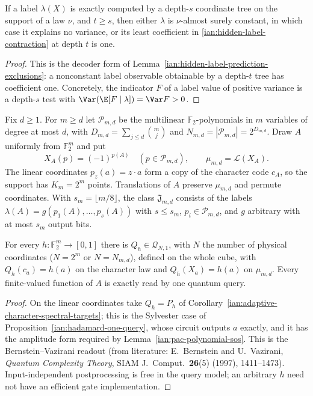 \begin{lemma}
\label{ian:inverse-hp-readable-obstruction}
If a label \(\lambda(X)\) is exactly computed by a depth-\(s\) coordinate tree on the support of a law \(\nu\), and \(t\ge s\), then either \(\lambda\) is \(\nu\)-almost surely constant, in which case it explains no variance, or its least coefficient in \eqref{ian:hidden-label-contraction} at depth \(t\) is one.
\end{lemma}

\begin{proof}
This is the decoder form of Lemma~\ref{ian:hidden-label-prediction-exclusions}: a nonconstant label observable obtainable by a depth-\(t\) tree has coefficient one. Concretely, the indicator \(F\) of a label value of positive variance is a depth-\(s\) test with \(\Var(\E[F\mid\lambda])=\Var F>0\).
\end{proof}

\begin{definition}
\label{ian:inverse-hp-polynomial-law}
Fix \(d\ge1\). For \(m\ge d\) let \(\mathcal P_{m,d}\) be the multilinear \(\mathbb F_2\)-polynomials in \(m\) variables of degree at most \(d\), with \(D_{m,d}=\sum_{j\le d}\binom mj\) and \(N_{m,d}=|\mathcal P_{m,d}|=2^{D_{m,d}}\). Draw \(A\) uniformly from \(\mathbb F_2^m\) and put
\[
 X_A(p)=(-1)^{p(A)}\quad(p\in\mathcal P_{m,d}),\qquad
 \mu_{m,d}=\mathcal L(X_A).
 \tag{37.2}
\]
The linear coordinates \(p_z(a)=z\cdot a\) form a copy of the character code \(c_A\), so the support has \(K_m=2^m\) points. Translations of \(A\) preserve \(\mu_{m,d}\) and permute coordinates. With \(s_m=\lfloor m/8\rfloor\), the class \(\mathfrak J_{m,d}\) consists of the labels \(\lambda(A)=g(p_1(A),\ldots,p_s(A))\) with \(s\le s_m\), \(p_i\in\mathcal P_{m,d}\), and \(g\) arbitrary with at most \(s_m\) output bits.
\end{definition}

\begin{lemma}
\label{ian:inverse-hp-universality}
For every \(h:\mathbb F_2^m\to[0,1]\) there is \(Q_h\in\mathcal Q_{N,1}\), with \(N\) the number of physical coordinates (\(N=2^m\) or \(N=N_{m,d}\)), defined on the whole cube, with \(Q_h(c_a)=h(a)\) on the character law and \(Q_h(X_a)=h(a)\) on \(\mu_{m,d}\). Every finite-valued function of \(A\) is exactly read by one quantum query.
\end{lemma}

\begin{proof}
On the linear coordinates take \(Q_h=P_h\) of Corollary~\ref{ian:adaptive-character-spectral-targets}; this is the Sylvester case of Proposition~\ref{ian:hadamard-one-query}, whose circuit outputs \(a\) exactly, and it has the amplitude form required by Lemma~\ref{ian:pac-polynomial-sos}. This is the Bernstein--Vazirani readout (from literature: E.~Bernstein and U.~Vazirani, \emph{Quantum Complexity Theory}, SIAM J.\ Comput.\ \textbf{26}(5) (1997), 1411--1473). Input-independent postprocessing is free in the query model; an arbitrary \(h\) need not have an efficient gate implementation.
\end{proof}

